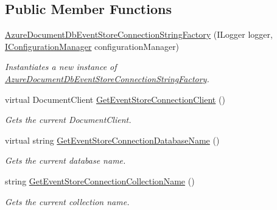 \subsection*{Public Member Functions}
\begin{DoxyCompactItemize}
\item 
\hyperlink{classCqrs_1_1Azure_1_1DocumentDb_1_1Events_1_1AzureDocumentDbEventStoreConnectionStringFactory_a7503e00bedc6af5686ded0b6b7719a30_a7503e00bedc6af5686ded0b6b7719a30}{Azure\+Document\+Db\+Event\+Store\+Connection\+String\+Factory} (I\+Logger logger, \hyperlink{interfaceCqrs_1_1Configuration_1_1IConfigurationManager}{I\+Configuration\+Manager} configuration\+Manager)
\begin{DoxyCompactList}\small\item\em Instantiates a new instance of \hyperlink{classCqrs_1_1Azure_1_1DocumentDb_1_1Events_1_1AzureDocumentDbEventStoreConnectionStringFactory}{Azure\+Document\+Db\+Event\+Store\+Connection\+String\+Factory}. \end{DoxyCompactList}\item 
virtual Document\+Client \hyperlink{classCqrs_1_1Azure_1_1DocumentDb_1_1Events_1_1AzureDocumentDbEventStoreConnectionStringFactory_ad221f74db207af105beae4fcb4908db7_ad221f74db207af105beae4fcb4908db7}{Get\+Event\+Store\+Connection\+Client} ()
\begin{DoxyCompactList}\small\item\em Gets the current Document\+Client. \end{DoxyCompactList}\item 
virtual string \hyperlink{classCqrs_1_1Azure_1_1DocumentDb_1_1Events_1_1AzureDocumentDbEventStoreConnectionStringFactory_af243f79315140e1f2c20a5c1695f4fb9_af243f79315140e1f2c20a5c1695f4fb9}{Get\+Event\+Store\+Connection\+Database\+Name} ()
\begin{DoxyCompactList}\small\item\em Gets the current database name. \end{DoxyCompactList}\item 
string \hyperlink{classCqrs_1_1Azure_1_1DocumentDb_1_1Events_1_1AzureDocumentDbEventStoreConnectionStringFactory_a47a2b2315a2ca8daa9355530a241c133_a47a2b2315a2ca8daa9355530a241c133}{Get\+Event\+Store\+Connection\+Collection\+Name} ()
\begin{DoxyCompactList}\small\item\em Gets the current collection name. \end{DoxyCompactList}\end{DoxyCompactItemize}
